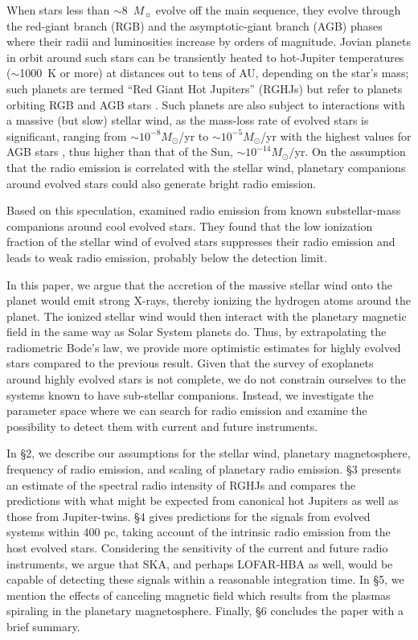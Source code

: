 \documentclass[iop,numberedappendix,apj]{emulateapj}
\begin{document}
When stars less than $\sim$8~$M_\sun$ evolve off the main sequence,
they evolve through the red-giant branch (RGB) and the
asymptotic-giant branch (AGB) phases where their radii and luminosities increase by orders of magnitude. 
Jovian planets in orbit around such stars can be transiently heated to hot-Jupiter temperatures ($\sim$1000~K or more) at distances out to tens of AU, depending on the star's mass; such planets are termed ``Red Giant Hot Jupiters'' (RGHJs) but refer to planets orbiting RGB and AGB stars \citep{spiegel+madhusudhan2012}. 
Such planets are also subject to interactions with a massive (but slow) stellar wind, as the mass-loss rate of evolved stars is significant, ranging from $\sim  10^{-8} M_\odot$/yr to $\sim  10^{-5} M_\odot$/yr with the highest values for AGB stars \citep[e.g.,][]{reimers1975, schild1989, vassiliadis1993, schoier2001, vanloon2005}, thus higher than that of the Sun, $\sim 10^{-14}M_\odot$/yr. 
On the assumption that the radio emission is correlated with the stellar wind, planetary companions around evolved stars could also generate bright radio emission. 

Based on this speculation, \citet{ignace2010} examined radio emission from known substellar-mass companions around cool evolved stars.
They found that the low ionization fraction of the stellar wind of evolved stars suppresses their radio emission and leads to weak radio emission, probably below the detection limit. 

In this paper, we argue that the accretion of the massive stellar wind onto the planet would emit strong X-rays, thereby ionizing the hydrogen atoms around the planet.
The ionized stellar wind would then interact with the planetary magnetic field in the same way as Solar System planets do.
Thus, by extrapolating the radiometric Bode's law, we provide more optimistic estimates for highly evolved stars compared to the previous result.
Given that the survey of exoplanets around highly evolved stars is not complete, we do not constrain ourselves to the systems known to have sub-stellar companions.
Instead, we investigate the parameter space where we can search for radio emission and examine the possibility to detect them with current and future instruments. 

In \S2, we describe our assumptions for the stellar wind, planetary magnetosphere, frequency of radio emission, and scaling of planetary radio emission.
\S3 presents an estimate of the spectral radio intensity of RGHJs and compares the predictions with what might be expected from canonical hot Jupiters as well as those from Jupiter-twins.
\S4 gives predictions for the signals from evolved systems within 400 pc, taking account of the intrinsic radio emission from the host evolved stars. Considering the sensitivity of the current and future radio instruments, we argue that SKA, and perhaps LOFAR-HBA as well, would be capable of detecting these signals within a reasonable integration time. 
In \S5, we mention the effects of canceling magnetic field which results from the plasmas spiraling in the planetary magnetosphere.  
Finally, \S6 concludes the paper with a brief summary. 
\end{document}

